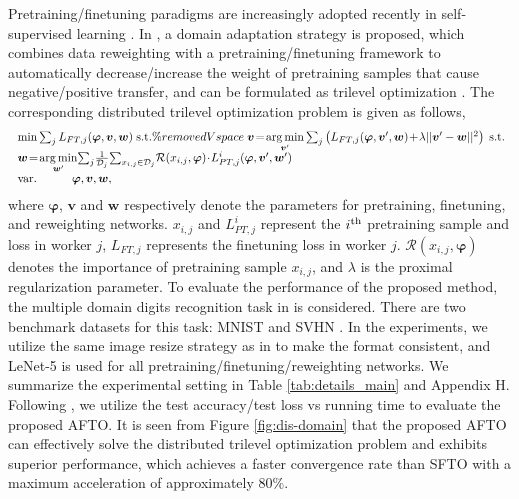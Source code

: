 \documentclass[letterpaper]{article}
\begin{document}
Pretraining/finetuning paradigms are increasingly adopted recently in self-supervised
learning \cite{he2020momentum}.  In \cite{raghu2021meta}, a domain adaptation strategy is proposed, which combines data reweighting with a pretraining/finetuning framework to automatically
decrease/increase the weight of pretraining samples that cause negative/positive transfer, and can be formulated as trilevel optimization \cite{choe2022betty}. The corresponding distributed trilevel optimization problem is given as follows,
\begin{equation}
\begin{array}{l}
\; \mathop {\min } \sum\nolimits_{j} L_{FT,j}({\boldsymbol{\varphi }} ,{\boldsymbol{v}},{\boldsymbol{w}}) \;{\mathop{\rm s.t.}} \%removedVspace

\; {\boldsymbol{v}}\! =\! \mathop {\arg \min }\limits_{{\boldsymbol{v}}'} \sum\nolimits_{j} \left(L_{FT,j}({\boldsymbol{\varphi }} ,{\boldsymbol{v}}',{\boldsymbol{w}}) \!+\! \lambda ||{\boldsymbol{v}}' -{\boldsymbol{w}} ||^2  \right) \;{\mathop{\rm s.t.}} \\

\; {\boldsymbol{w}}\! =\! \mathop {\arg \min }\limits_{{\boldsymbol{w}}'} \!\sum\nolimits_{j} \! \frac{1}{\mathcal{D}_j}\!\sum\nolimits_{x_{i,j}\in\mathcal{D}_j}\! \mathcal{R}(x_{i,j}, {\boldsymbol{\varphi }})\!\cdot \! L_{PT,j}^i({\boldsymbol{\varphi }} ,{\boldsymbol{v}}',{\boldsymbol{w}}')  \\
\;  {\mathop{\rm var.}} \qquad \quad {\boldsymbol{\varphi }} ,{\boldsymbol{v}},{\boldsymbol{w}},
\end{array}
\end{equation}
where ${\boldsymbol{\varphi }}$, ${\boldsymbol{v}}$ and ${\boldsymbol{w}}$ respectively denote the parameters for pretraining, finetuning, and reweighting networks. $x_{i,j}$ and $L_{PT,j}^i$ represent the $i^{\rm{th}}$ pretraining sample and loss in worker $j$, $L_{FT,j}$ represents the finetuning loss in worker $j$. $\mathcal{R}(x_{i,j}, {\boldsymbol{\varphi }})$ denotes the importance of pretraining sample $x_{i,j}$, and $\lambda$ is the proximal regularization parameter. To evaluate the performance of the proposed method, the multiple domain digits recognition task in \cite{qian2019robust,wang2021discriminative} is considered.  There are two benchmark datasets for
this task: MNIST \cite{lecun1998gradient} and SVHN \cite{netzer2011reading}. In the experiments, we utilize the same image resize strategy as in \cite{qian2019robust} to make the format consistent, and LeNet-5 is used for all pretraining/finetuning/reweighting networks. We summarize the experimental setting in Table \ref{tab:details_main} and Appendix H. Following \cite{ji2021bilevel}, we utilize the test accuracy/test loss vs running time to evaluate the proposed AFTO. It is seen from Figure \ref{fig:dis-domain} that the proposed AFTO can effectively solve the distributed trilevel optimization problem and exhibits superior performance,  which achieves a faster convergence rate than SFTO with a maximum acceleration of approximately 80$\%$.
\end{document}
